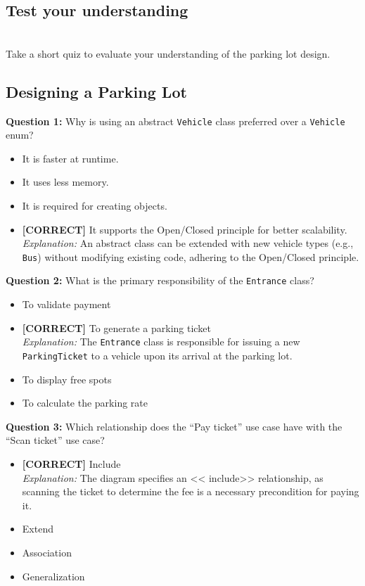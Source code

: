 \subsection{Test your understanding}\label{_Yr6Wm2koXiy540gGdiD6}
\\
Take a short quiz to evaluate your understanding of the parking lot design.

\subsection*{Designing a Parking Lot}
\vspace{0.3cm}
\noindent
\textbf{Question 1:} Why is using an abstract \texttt{Vehicle} class preferred over a \texttt{Vehicle} enum?
\\[0.2cm]
\begin{itemize}
 \item It is faster at runtime.
 \item It uses less memory.
 \item It is required for creating objects.
 \item \textbf{[CORRECT]} It supports the Open/Closed principle for better scalability.
\\[0.1cm]
\textit{Explanation:} 
An abstract class can be extended with new vehicle types (e.g., \texttt{Bus}) without modifying existing code, adhering to the Open/Closed principle.
\end{itemize}
\vspace{0.3cm}
\noindent
\textbf{Question 2:} What is the primary responsibility of the \texttt{Entrance} class?
\\[0.2cm]
\begin{itemize}
 \item To validate payment
 \item \textbf{[CORRECT]} To generate a parking ticket
\\[0.1cm]
\textit{Explanation:} 
The \texttt{Entrance} class is responsible for issuing a new \texttt{ParkingTicket} to a vehicle upon its arrival at the parking lot.
 \item To display free spots
 \item To calculate the parking rate
\end{itemize}
\vspace{0.3cm}
\noindent
\textbf{Question 3:} Which relationship does the ``Pay ticket'' use case have with the ``Scan ticket'' use case?
\\[0.2cm]
\begin{itemize}
 \item \textbf{[CORRECT]} Include
\\[0.1cm]
\textit{Explanation:} 
The diagram specifies an \textless{\textless{} include\textgreater{}\textgreater{}} relationship, as scanning the ticket to determine the fee is a necessary precondition for paying it.
 \item Extend
 \item Association
 \item Generalization
\end{itemize}
